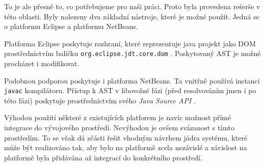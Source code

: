 To je ale přesně to, co potřebujeme pro naši práci. Proto byla provedena rešerše v této oblasti. Byly nalezeny dva základní nástroje, které je možné použít. Jedná se o  platformu Eclipse a platformu NetBeans.

Platforma Eclipse poskytuje rozhraní, které reprezentuje java projekt jako DOM prostřednictvím balíčku \verb+org.eclipse.jdt.core.dom+ \cite{parsertools:eclipsejdt}. Poskytovaný AST je možné procházet i modifikovat.

Podobnou podporou poskytuje i platforma NetBeans. Ta vnitřně používá instanci \verb+javac+ kompilátoru. Přístup k AST v libovolné fázi (před resolvováním jmen i po této fázi) poskytuje prostřednictvím svého \emph{Java Source API} \cite{parsertools:javasourcejavadoc}.

Výhodou použití některé z existujících platforem je navíc možnost přímé integrace do vývojového prostředí. Nevýhodou je ovšem svázanost s tímto prostředím. To se však dá zčásti řešit vhodným návrhem jádra systému, které může být realizováno tak, aby bylo na platformě zcela nezávislé a závislost na platformě byla přidávána až integrací do konkrétního prostředí.
